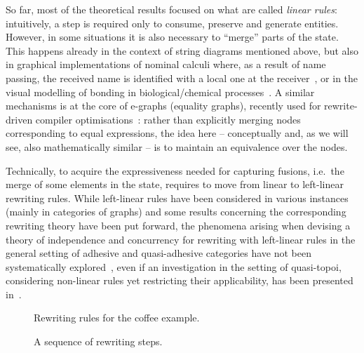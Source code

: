 \documentclass[a4paper,UKenglish,cleveref,pdftex,thm-restate,numberwithinsect]{lipics-v2021}
\begin{document}
So far, most of the theoretical results focused on what are called
\emph{linear rules}: intuitively, a step is required only to consume,
preserve and generate entities.  However, in some situations it is
also necessary to ``merge'' parts of the state.  This happens already
in the context of string diagrams mentioned above, but also in
graphical implementations of nominal calculi where, as a result of
name passing, the received name is identified with a local one at the
receiver~\cite{CVY:ESSPE,Gad07}, or in the visual modelling of bonding
in biological/chemical processes~\cite{PUY:MBPE}. A similar mechanisms
is at the core of e-graphs (equality graphs), recently used for
rewrite-driven compiler optimisations~\cite{WNW:egg}: rather than
explicitly merging nodes corresponding to equal expressions, the idea
here -- conceptually and, as we will see, also mathematically similar
-- is to maintain an
equivalence %
over the nodes.



Technically, to acquire the expressiveness needed for capturing
fusions, i.e.~the merge of some elements in the state, requires to
move from linear to left-linear rewriting rules. While left-linear
rules have been considered in various instances (mainly in categories
of graphs) and some results concerning the corresponding rewriting
theory have been put forward, %
the phenomena arising when devising a theory of independence and
concurrency for rewriting with left-linear rules in the general
setting of adhesive and quasi-adhesive categories
have not been systematically
explored~\cite{Ehrig1976,EHP:BRfTToHLRS,baldan2011adhesivity},
even if an investigation in the setting of quasi-topoi, considering
non-linear rules yet restricting their applicability,
has been presented in~\cite{behr2021concurrency,BehrHK23}.

\begin{figure}
  
  
  \caption{Rewriting rules for the coffee example.}
  \label{fi:coffee-rules}
\end{figure}

\begin{figure}
  
  \caption{A sequence of rewriting steps.}
  \label{fi:coffee-rewriting}
\end{figure}
\end{document}
